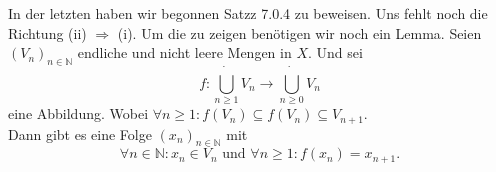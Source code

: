 \chapter{}
In der letzten haben wir begonnen Satzz 7.0.4 zu beweisen. 
Uns fehlt noch die Richtung (ii) $\Rightarrow$ (i).
Um die zu zeigen benötigen wir noch ein Lemma.
{
    Seien $(V_n)_{n \in \mathbb{N}}$ endliche und nicht leere Mengen in $X$. 
    Und sei 
    $$
    f: \dot{\bigcup_{n \geq 1}} V_n \to \dot{\bigcup_{n \geq 0}} V_n
    $$ eine Abbildung. 
    Wobei $\forall n \geq 1: f(V_n) \subseteq f(V_{n})\subseteq V_{n+1}$. \\
    Dann gibt es eine  Folge $(x_n)_{n \in \mathbb{N}}$ mit
    $$
    \forall n \in  \mathbb{N}: x_n \in V_n 
    \text{ und } \forall n \geq 1: f(x_n) = x_{n+1}.
    $$  
}

